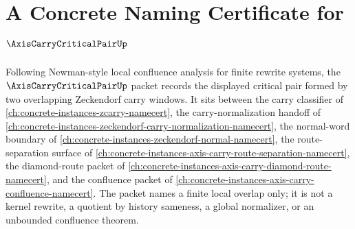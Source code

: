\chapter{A Concrete Naming Certificate for $\AxisCarryCriticalPairUp$}
\label{ch:concrete-instances-axis-carry-critical-pair-namecert}

Following Newman-style local confluence analysis for finite rewrite systems, the $\AxisCarryCriticalPairUp$ packet records the displayed critical pair formed by two overlapping Zeckendorf carry windows. It sits between the carry classifier of \autoref{ch:concrete-instances-zcarry-namecert}, the carry-normalization handoff of \autoref{ch:concrete-instances-zeckendorf-carry-normalization-namecert}, the normal-word boundary of \autoref{ch:concrete-instances-zeckendorf-normal-namecert}, the route-separation surface of \autoref{ch:concrete-instances-axis-carry-route-separation-namecert}, the diamond-route packet of \autoref{ch:concrete-instances-axis-carry-diamond-route-namecert}, and the confluence packet of \autoref{ch:concrete-instances-axis-carry-confluence-namecert}. The packet names a finite local overlap only; it is not a kernel rewrite, a quotient by history sameness, a global normalizer, or an unbounded confluence theorem.

